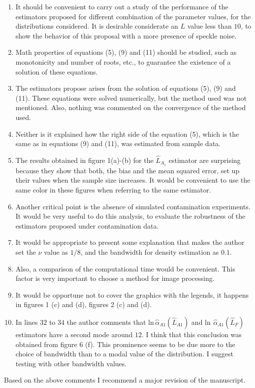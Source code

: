 \documentclass[journal,onecolumn,12pt]{IEEEtran}
\begin{document}
\begin{enumerate}
	\item It should be convenient  to carry out a study of the performance of the estimators proposed for different combination of the parameter values, for the distributions considered. It is desirable considerate an $L$ value less than $10$, to show the behavior of this proposal with a more presence of speckle noise.
	\item Math properties of equations (5), (9) and (11) should be studied, such as monotonicity and number of roots, etc., to guarantee the existence of a solution of these equations. 
	\item The estimators propose arises from the solution of equations (5), (9) and (11). These equations were solved numerically, but the method used was not mentioned. Also, nothing was commented on the convergence of the method used.
	\item Neither is it explained how the right side of the equation (5), which is the same as in equations (9) and (11), was estimated from sample data.
	\item The results obtained in figure 1(a)-(b) for the $\hat{L}_{A_1}$ estimator are surprising because they show that both, the bias and the mean squared error, set up their values when the sample size increases. It would be convenient to use the same color in these figures when referring to the same estimator. 
	\item Another critical point is the absence of simulated contamination experiments. It would be very useful to do this analysis, to evaluate the robustness of the estimators proposed under contamination data.
	\item It would be appropriate to present some explanation that makes the author set the $\nu$ value as $1/8$, and the bandwidth for density estimation as $0.1$. 
	\item Also, a comparison of  the computational time would be convenient. This factor is very important to choose a method for image processing.
	\item It would be opportune not to cover the graphics with the legends, it happens in figures 1 (c) and (d), figures 2 (c) and (d).
	\item In lines $32$ to $34$ the author comments that $\mathrm{ln} \, \hat{\alpha}_{A1}(\hat{L}_{A1})$ and $\mathrm{ln} \, \ \hat{\alpha}_{A1}(\hat{L}_{F})$ estimators have a second mode around $12$. I think that this conclusion was obtained from figure 6 (f). This prominence seems to be due more to the choice of bandwidth than to a modal value of the distribution. I suggest testing with other bandwidth values.
\end{enumerate}

\vspace{0.5cm}
Based on the above comments I recommend a major revision of the manuscript.
\end{document}
